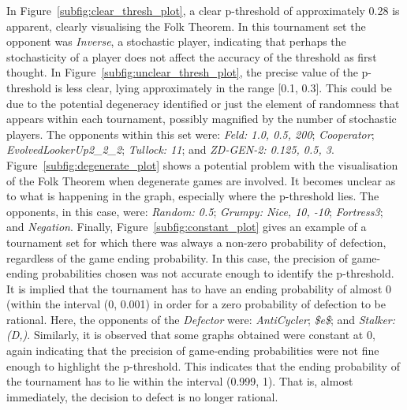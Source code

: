 In Figure~\ref{subfig:clear_thresh_plot}, a clear p-threshold of approximately
0.28 is apparent, clearly visualising the Folk Theorem. In this tournament set
the opponent was \textit{Inverse}, a stochastic player, indicating that perhaps
the stochasticity of a player does not affect the accuracy of the threshold as
first thought. In Figure~\ref{subfig:unclear_thresh_plot}, the precise value of
the p-threshold is less clear, lying approximately in the range [0.1, 0.3]. This
could be due to the potential degeneracy identified or just the element of
randomness that appears within each tournament, possibly magnified by the number
of stochastic players. The opponents within this set
were: \textit{Feld: 1.0, 0.5, 200}; \textit{Cooperator};
\textit{EvolvedLookerUp2\_2\_2}; \textit{Tullock: 11}; and \textit{ZD-GEN-2:
0.125, 0.5, 3}. Figure~\ref{subfig:degenerate_plot} shows a potential problem
with the visualisation of the Folk Theorem when degenerate games are involved.
It becomes unclear as to what is happening in the graph,
especially where the p-threshold lies. The opponents, in this case, were:
\textit{Random: 0.5}; \textit{Grumpy: Nice, 10, -10}; \textit{Fortress3}; and
\textit{Negation}. Finally, Figure~\ref{subfig:constant_plot} gives an example
of a tournament set for which there was always a non-zero probability of
defection, regardless of the game ending probability. In this case, the
precision of game-ending probabilities chosen was not accurate enough to
identify the p-threshold. It is implied that the tournament has to have an
ending probability of almost 0 (within the interval (0, 0.001) in order for a
zero probability of defection to be rational. Here, the opponents of the
\textit{Defector} were: \textit{AntiCycler}; \textit{\$e\$}; and
\textit{Stalker: (D,)}. Similarly, it is observed that some graphs obtained
were constant at 0, again indicating that the precision of game-ending
probabilities were not fine enough to highlight the p-threshold. This indicates
that the ending probability of the tournament has to lie within the interval
(0.999, 1). That is, almost immediately, the decision to defect is no longer rational.

%    


